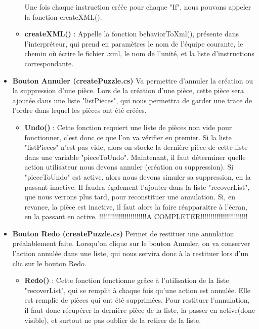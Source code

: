 \documentclass{article}
\begin{document}
\begin{itemize}
\begin{itemize}
Une fois chaque instruction créée pour chaque "If", nous pouvons appeler la fonction createXML().\newline
\item\textbf{createXML()} : Appelle la fonction behaviorToXml(), présente dans l'interpréteur, qui prend en paramètres le nom de l'équipe courante, le chemin où écrire le fichier .xml, le nom de l'unité, et la liste d'instructions correspondante.
\end{itemize}
\smallbreak
\item\textbf{Bouton Annuler (createPuzzle.cs)}
Va permettre d'annuler la création ou la suppression d'une pièce. Lors de la création d'une pièce, cette pièce sera ajoutée dans une liste "listPieces", qui nous permettra de garder une trace de l'ordre dans lequel les pièces ont été créées.
\smallbreak
\begin{itemize}
\item\textbf{Undo()} : Cette fonction requiert une liste de pièces non vide pour fonctionner, c'est donc ce que l'on va vérifier en premier. Si la liste "listPieces" n'est pas vide, alors on stocke la dernière pièce de cette liste dans une variable "pieceToUndo".\newline
Maintenant, il faut déterminer quelle action utilisateur nous devons annuler (création ou suppression).\newline
Si "pieceToUndo" est active, alors nous devons simuler sa suppression, en la passant inactive. Il faudra également l'ajouter dans la liste "recoverList", que nous verrons plus tard, pour reconstituer une annulation.\newline
Si, en revance, la pièce est inactive, il faut alors la faire réapparaitre à l'écran, en la passant en active.
\smallbreak
!!!!!!!!!!!!!!!!!!!!!!!!A COMPLETER!!!!!!!!!!!!!!!!!!!!!!!!
\smallbreak
\end{itemize}
\item\textbf{Bouton Redo (createPuzzle.cs)}
Permet de restituer une annulation préalablement faite. Lorsqu'on clique sur le bouton Annuler, on va conserver l'action annulée dans une liste, qui nous servira donc à la restituer lors d'un clic sur le bouton Redo.
\smallbreak
\begin{itemize}
\item\textbf{Redo()} : Cette fonction fonctionne grâce à l'utilisation de la liste "recoverList", qui se remplit à chaque fois qu'une action est annulée. Elle est remplie de pièces qui ont été supprimées. Pour restituer l'annulation, il faut donc récupérer la dernière pièce de la liste, la passer en active(donc visible), et surtout ne pas oublier de la retirer de la liste.
\end{itemize}
\smallbreak
\end{itemize}
\end{document}
